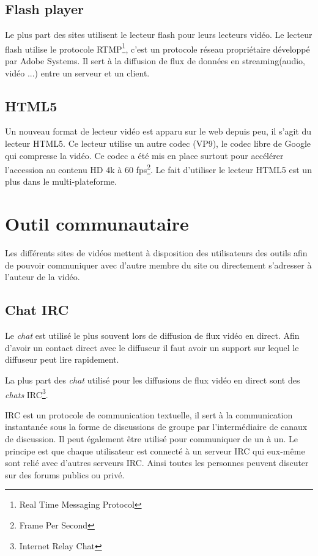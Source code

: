 \documentclass[11pt]{report} %
\begin{document}
		\subsection{Flash player}
		Le plus part des sites utilisent le lecteur flash pour leurs lecteurs vidéo. Le lecteur flash utilise le protocole RTMP\footnote{Real Time Messaging Protocol}, c'est un protocole réseau propriétaire développé par Adobe Systems. Il sert à la diffusion de flux de données en streaming(audio, vidéo ...) entre un serveur et un client.
		
		\subsection{HTML5}
		Un nouveau format de lecteur vidéo est apparu sur le web depuis peu, il s'agit du lecteur HTML5. Ce lecteur utilise un autre codec (VP9), le codec libre de Google qui compresse la vidéo. Ce codec a été mis en place surtout pour accélérer l'accession au contenu HD 4k à 60 fps\footnote{Frame Per Second}.
		Le fait d'utiliser le lecteur HTML5 est un plus dans le multi-plateforme.
	
	\section{Outil communautaire}
	Les différents sites de vidéos mettent à disposition des utilisateurs des outils afin de pouvoir communiquer avec d'autre membre du site ou directement s'adresser à l'auteur de la vidéo.
		\subsection{Chat IRC}
		Le \textit{chat} est utilisé le plus souvent lors de diffusion de flux vidéo en direct. Afin d'avoir un contact direct avec le diffuseur il faut avoir un support sur lequel le diffuseur peut lire rapidement.
		
		La plus part des \textit{chat} utilisé pour les diffusions de flux vidéo en direct sont des \textit{chats} IRC\footnote{Internet Relay Chat}.
		
		IRC est un protocole de communication textuelle, il sert à la communication instantanée sous la forme de discussions de groupe par l'intermédiaire de canaux de discussion. Il peut également être utilisé pour communiquer de un à un.
		Le principe est que chaque utilisateur est connecté à un serveur IRC qui eux-même sont relié avec d'autres serveurs IRC. Ainsi toutes les personnes peuvent discuter sur des forums publics ou privé.
		
\end{document}
